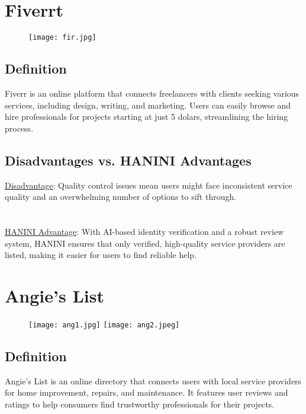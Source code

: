 \documentclass[12pt,a4paper]{report}
\begin{document}
\section{Fiverrt}
\begin{figure}[ht]
    \begin{center}
        \texttt{[image: fir.jpg]}
         
     \end{center}
\end{figure}
\subsection*{Definition}
Fiverr is an online platform that connects freelancers with clients seeking various services, including design, writing, and marketing. Users can easily browse and hire professionals for projects starting at just 5 dolars, streamlining the hiring process.
\subsection*{Disadvantages vs. HANINI Advantages}
\underline {Disadvantage}: Quality control issues mean users might face inconsistent service quality and an overwhelming number of options to sift through.\\
\textbf{                      }\\
\textbf{                      }\\
\underline {HANINI Advantage}:  With AI-based identity verification and a robust review system, HANINI ensures that only verified, high-quality service providers are listed, making it easier for users to find reliable help.


\section{Angie’s List}
\begin{figure}[ht]
    \begin{center}
        \texttt{[image: ang1.jpg]}
         \texttt{[image: ang2.jpeg]}
     \end{center}
\end{figure}
\subsection*{Definition}
Angie’s List is an online directory that connects users with local service providers for home improvement, repairs, and maintenance. It features user reviews and ratings to help consumers find trustworthy professionals for their projects.
\end{document}
